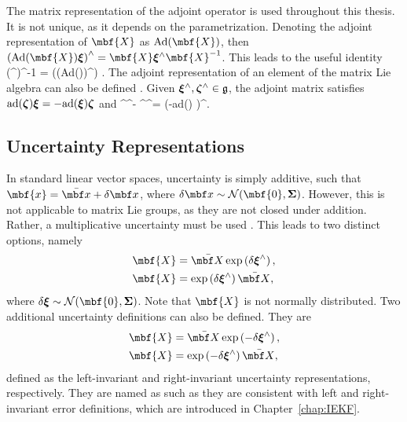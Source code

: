 The matrix representation of the adjoint operator is used throughout this thesis. It is not unique, as it depends on the parametrization. Denoting the adjoint representation of $\mbf{X}$ as $\textrm{Ad}(\mbf{X})$, then 
$\left(\textrm{Ad}(\mbf{X})\mbs{\xi}\right)^\wedge = \mbf{X}\mbs{\xi}^\wedge\mbf{X}^{-1}$. This leads to the useful identity
\beq
	\exp(\mbs{\xi}^\wedge)^{-1} = \exp\left(\left(\textrm{Ad}()\mbs{\xi}\right)^\wedge\right) \label{eq:Ad_identity}.
\eeq
The adjoint representation of an element of the matrix Lie algebra can also be defined \cite{Barrau2017,Hall2014}. Given $\boldsymbol{\xi}^\wedge,\boldsymbol{\zeta}^\wedge \in \mathfrak{g}$, 
the adjoint matrix satisfies  $\textrm{ad}(\boldsymbol{\zeta}) \boldsymbol{\xi} = -\textrm{ad}(\boldsymbol{\xi})\boldsymbol{\zeta}$ and
\beq
	\mbs{\xi}^\wedge\mbs{\zeta}^\wedge - \mbs{\zeta}^\wedge\mbs{\xi}^\wedge = \left(-\textrm{ad}(\mbs{\zeta}) \mbs{\xi}\right)^\wedge. \label{eq:ad_identity}
\eeq

\subsection{Uncertainty Representations}
\label{ssec:uncertainty}
In standard linear vector spaces, uncertainty is simply additive, such that $\mbf{x} = \mbfbar{x} + \mbfdel{x}$, where $\mbfdel{x} \sim \mathcal{N}(\mbf{0},\mbs{\Sigma})$. However, this is not applicable to matrix Lie groups, as they are not closed under addition. Rather, a multiplicative uncertainty must be used \cite{Barfoot2014}. This leads to two distinct options, namely
\begin{align}
	\mbf{X} &= \mbfbar{X}\expmapw{\mbsdel{\xi}}, \label{eq:left_unc}\\
	\mbf{X} &= \expmapw{\mbsdel{\xi}}\mbfbar{X}, \label{eq:right_unc}
\end{align}
where $\mbsdel{\xi} \sim \mathcal{N}(\mbf{0},\mbs{\Sigma})$. Note that $\mbf{X}$ is not normally distributed. Two additional uncertainty definitions can also be defined. They are
\begin{align}
	\mbf{X} &= \mbfbar{X}\expmapw{-\mbsdel{\xi}},  \label{eq:left_inv_unc}\\
	\mbf{X} &= \expmapw{-\mbsdel{\xi}}\mbfbar{X}, \label{eq:right_inv_unc}
\end{align}
defined as the left-invariant and right-invariant uncertainty representations, respectively. They are named as such as they are consistent with left and right-invariant error definitions, which are introduced in Chapter~\ref{chap:IEKF}.

